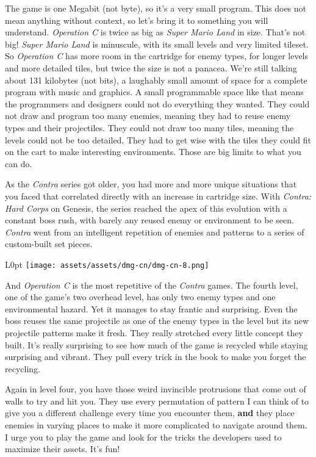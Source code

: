 \documentclass{book}
\begin{document}
The game is one Megabit (not byte), so it’s a very small program. This does not mean anything without context, so let’s bring it to something you will understand. \emph{Operation C} is twice as big as \emph{Super Mario Land} in size. That’s not big! \emph{Super Mario Land} is minuscule, with its small levels and very limited tileset. So \emph{Operation C} has more room in the cartridge for enemy types, for longer levels and more detailed tiles, but twice the size is not a panacea. We’re still talking about 131 kilobytes (not bits), a laughably small amount of space for a complete program with music and graphics. A small programmable space like that means the programmers and designers could not do everything they wanted. They could not draw and program too many enemies, meaning they had to reuse enemy types and their projectiles. They could not draw too many tiles, meaning the levels could not be too detailed. They had to get wise with the tiles they could fit on the cart to make interesting environments. Those are big limits to what you can do.

As the \emph{Contra} series got older, you had more and more unique situations that you faced that correlated directly with an increase in cartridge size. With \emph{Contra: Hard Corps} on Genesis, the series reached the apex of this evolution with a constant boss rush, with barely any reused enemy or environment to be seen. \emph{Contra} went from an intelligent repetition of enemies and patterns to a series of custom-built set pieces.

\begin{wrapfigure}{L}{0pt} \texttt{[image: assets/assets/dmg-cn/dmg-cn-8.png]}\end{wrapfigure}
And \emph{Operation C} is the most repetitive of the \emph{Contra} games. The fourth level, one of the game’s two overhead level, has only two enemy types and one environmental hazard. Yet it manages to stay frantic and surprising. Even the boss reuses the same projectile as one of the enemy types in the level but its new projectile patterns make it fresh. They really stretched every little concept they built. It’s really surprising to see how much of the game is recycled while staying surprising and vibrant. They pull every trick in the book to make you forget the recycling.

Again in level four, you have those weird invincible protrusions that come out of walls to try and hit you. They use every permutation of pattern I can think of to give you a different challenge every time you encounter them, \textbf{and} they place enemies in varying places to make it more complicated to navigate around them. I urge you to play the game and look for the tricks the developers used to maximize their assets. It’s fun!
\end{document}

